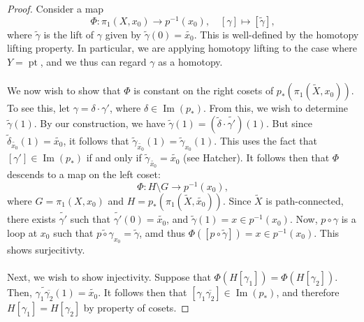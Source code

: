 \documentclass[a4paper]{report}
\theoremstyle{definition}
\theoremstyle{remark}
\theoremstyle{proposition}
\theoremstyle{conjecture}
\theoremstyle{lemma}
\theoremstyle{corollary}
\theoremstyle{exercise}
\newcommand{\on}{\operatorname}
\begin{document}
\begin{proof}
    Consider a map 
    $$\Phi : \pi_1(X,x_0) \longrightarrow p^{-1}(x_0),\quad [\gamma] \longmapsto [\widetilde{\gamma}],$$
    where $\widetilde{\gamma}$ is the lift of $\gamma$ given by $\widetilde{\gamma}(0) = \widetilde{x_0}$.
    This is well-defined by the homotopy lifting property. In particular, we are applying 
    homotopy lifting to the case where $Y = \on{pt}$, and we thus can regard $\gamma$ as a 
    homotopy. \\\\
    We now wish to show that  $\Phi$ is constant on the right cosets of 
    $p_\ast(\pi_1(\widetilde{X},x_0))$. To see this, let 
    $\gamma = \delta \cdot \gamma'$, where $\delta \in \on{Im}(p_\ast)$.
    From this, we wish to determine $\widetilde{\gamma}(1)$. 
    By our construction, we have $\widetilde{\gamma}(1) = (\widetilde{\delta}\cdot\widetilde{\gamma'})(1)$.
    But since $\widetilde{\delta}_{\widetilde{x_0}}(1) = \widetilde{x_0}$,
    it follows that $\widetilde{\gamma}_{\widetilde{x_0}} (1) = \widetilde{\gamma}_{x_0}(1)$.
    This uses the fact that $[\gamma'] \in \on{Im}(p_\ast)$ if and only if 
    $\widetilde{\gamma}_{\widetilde{x_0}} = \widetilde{x_0}$ (see Hatcher).
    It follows then that $\Phi$ descends to a map on the left coset: 
    $$\Phi : H\setminus G \longrightarrow p^{-1}(x_0),$$ 
    where $G = \pi_1(X,x_0)$ and $H = p_\ast\left(\pi_1(\widetilde{X},\widetilde{x_0})\right)$.
    Since $\widetilde{X}$ is path-connected, there exists $\widetilde{\gamma'}$ such that 
    $\widetilde{\gamma'}(0) = \widetilde{x_0}$, and 
    $\widetilde{\gamma}(1) = x \in p^{-1}(x_0)$. 
    Now, $p\circ \gamma$ is a loop at $x_0$ such that $\widetilde{p\circ \gamma}_{x_0} = \widetilde{\gamma}$,
    amd thus $\Phi([p\circ \widetilde{\gamma}]) = x \in p^{-1}(x_0)$.
    This shows surjecitivty.\\\\ 
    Next, we wish to show injectivity. Suppose that $\Phi(H[\gamma_1]) = \Phi(H[\gamma_2])$.
    Then, $\widetilde{\gamma_1\overline{\gamma_2}}(1) = \widetilde{x_0}$.
    It follows then that $[\gamma_1\overline{\gamma_2}] \in \on{Im}(p_\ast)$,
    and therefore $H[\gamma_1] = H[\gamma_2]$ by property of cosets.
\end{proof}
\end{document}

